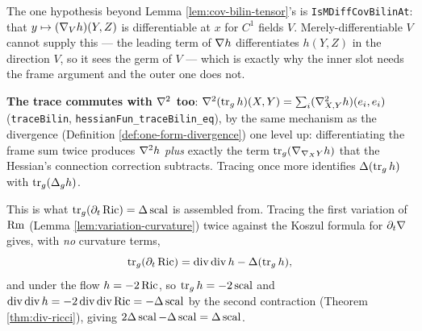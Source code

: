 \begin{definition}
  The one hypothesis beyond Lemma \ref{lem:cov-bilin-tensor}'s is
  \texttt{IsMDiffCovBilinAt}: that $y \mapsto (\nabla_V h)(Y,Z)$ is differentiable
  at $x$ for $C^1$ fields $V$. Merely-differentiable $V$ cannot supply this ---
  the leading term of $\nabla h$ differentiates $h(Y,Z)$ in the direction $V$, so
  it sees the germ of $V$ --- which is exactly why the inner slot needs the
  frame argument and the outer one does not.

  \textbf{The trace commutes with $\nabla^2$ too}: $\nabla^2(\operatorname{tr}_g
  h)(X,Y) = \sum_i (\nabla^2_{X,Y}h)(e_i,e_i)$ (\texttt{traceBilin},
  \texttt{hessianFun\_traceBilin\_eq}), by the same mechanism as the
  divergence (Definition \ref{def:one-form-divergence}) one level up:
  differentiating the frame sum twice produces $\nabla^2h$ \emph{plus} exactly
  the term $\operatorname{tr}_g(\nabla_{\nabla_XY} h)$ that the Hessian's
  connection correction subtracts. Tracing once more identifies
  $\Delta(\operatorname{tr}_g h)$ with $\operatorname{tr}_g(\Delta_g h)$.

  This is what $\operatorname{tr}_g(\partial_t\operatorname{Ric}) = \Delta \operatorname{scal}$ is
  assembled from. Tracing the first variation of $\operatorname{Rm}$ (Lemma
  \ref{lem:variation-curvature}) twice against the Koszul formula for
  $\partial_t\nabla$ gives, with \emph{no} curvature terms,
  \[
    \operatorname{tr}_g(\partial_t \operatorname{Ric})
      = \operatorname{div}\operatorname{div} h - \Delta(\operatorname{tr}_g h),
  \]
  and under the flow $h = -2\operatorname{Ric}$, so $\operatorname{tr}_g h = -2\operatorname{scal}$ and
  $\operatorname{div}\operatorname{div} h = -2\operatorname{div}\operatorname{div}\operatorname{Ric}
  = -\Delta \operatorname{scal}$ by the second contraction (Theorem \ref{thm:div-ricci}),
  giving $2\Delta\operatorname{scal} - \Delta\operatorname{scal} = \Delta\operatorname{scal}$.
\end{definition}

